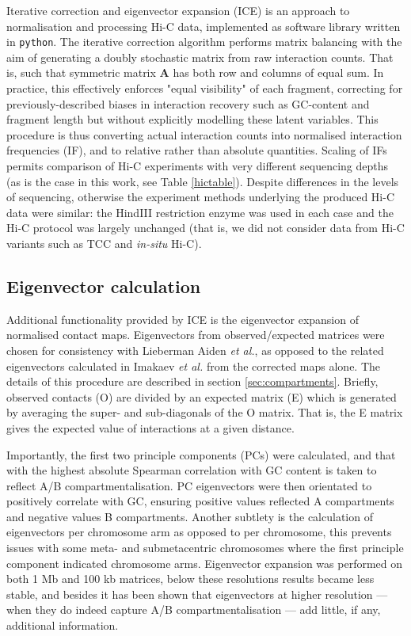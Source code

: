 \documentclass[a4paper,11pt,oneside]{book}
\begin{document}
Iterative correction and eigenvector expansion (ICE) is an approach to normalisation and processing Hi-C data, implemented as software library written in \texttt{python}.\citep{Imakaev2012} The iterative correction algorithm performs matrix balancing with the aim of generating a doubly stochastic matrix from raw interaction counts.\cite{Lajoie2014} That is, such that symmetric matrix $\mathbf{A}$ has both row and columns of equal sum. In practice, this effectively enforces "equal visibility" of each fragment, correcting for previously-described biases in interaction recovery such as GC-content and fragment length\cite{Yaffe2011} but without explicitly modelling these latent variables. This procedure is thus converting actual interaction counts into normalised interaction frequencies (IF), and to relative rather than absolute quantities. Scaling of IFs permits comparison of Hi-C experiments with very different sequencing depths (as is the case in this work, see Table \ref{hictable}). Despite differences in the levels of sequencing, otherwise the experiment methods underlying the produced Hi-C data were similar: the HindIII restriction enzyme was used in each case and the Hi-C protocol was largely unchanged (that is, we did not consider data from Hi-C variants such as TCC\cite{Kalhor2012} and \emph{in-situ} Hi-C\cite{Rao2014}).

\subsection{Eigenvector calculation}\label{sec:eigs}
Additional functionality provided by ICE is the eigenvector expansion of normalised contact maps. Eigenvectors from observed/expected matrices were chosen for consistency with Lieberman Aiden \emph{et al.},\cite{Lieberman2009} as opposed to the related eigenvectors calculated in Imakaev \emph{et al.}\cite{Imakaev2012} from the corrected maps alone. The details of this procedure are described in section \ref{sec:compartments}. Briefly, observed contacts (O) are divided by an expected matrix (E) which is generated by averaging the super- and sub-diagonals of the O matrix. That is, the E matrix gives the expected value of interactions at a given distance.

Importantly, the first two principle components (PCs) were calculated, and that with the highest absolute Spearman correlation with GC content is taken to reflect A/B compartmentalisation. PC eigenvectors were then orientated to positively correlate with GC, ensuring positive values reflected A compartments and negative values B compartments. Another subtlety is the calculation of eigenvectors per chromosome arm as opposed to per chromosome, this prevents issues with some meta- and submetacentric chromosomes where the first principle component indicated chromosome arms.\cite{Lieberman2009, Imakaev2012} Eigenvector expansion was performed on both 1 Mb and 100 kb matrices, below these resolutions results became less stable, and besides it has been shown that eigenvectors at higher resolution --- when they do indeed capture A/B compartmentalisation --- add little, if any, additional information.\cite{Fortin2015a}
\end{document}
